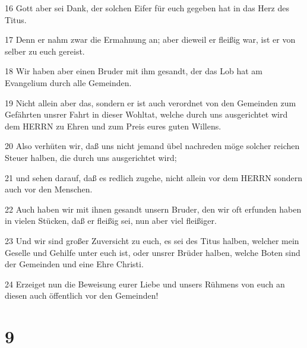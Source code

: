 \par 16 Gott aber sei Dank, der solchen Eifer für euch gegeben hat in das Herz des Titus.
\par 17 Denn er nahm zwar die Ermahnung an; aber dieweil er fleißig war, ist er von selber zu euch gereist.
\par 18 Wir haben aber einen Bruder mit ihm gesandt, der das Lob hat am Evangelium durch alle Gemeinden.
\par 19 Nicht allein aber das, sondern er ist auch verordnet von den Gemeinden zum Gefährten unsrer Fahrt in dieser Wohltat, welche durch uns ausgerichtet wird dem HERRN zu Ehren und zum Preis eures guten Willens.
\par 20 Also verhüten wir, daß uns nicht jemand übel nachreden möge solcher reichen Steuer halben, die durch uns ausgerichtet wird;
\par 21 und sehen darauf, daß es redlich zugehe, nicht allein vor dem HERRN sondern auch vor den Menschen.
\par 22 Auch haben wir mit ihnen gesandt unsern Bruder, den wir oft erfunden haben in vielen Stücken, daß er fleißig sei, nun aber viel fleißiger.
\par 23 Und wir sind großer Zuversicht zu euch, es sei des Titus halben, welcher mein Geselle und Gehilfe unter euch ist, oder unsrer Brüder halben, welche Boten sind der Gemeinden und eine Ehre Christi.
\par 24 Erzeiget nun die Beweisung eurer Liebe und unsers Rühmens von euch an diesen auch öffentlich vor den Gemeinden!

\chapter{9}

